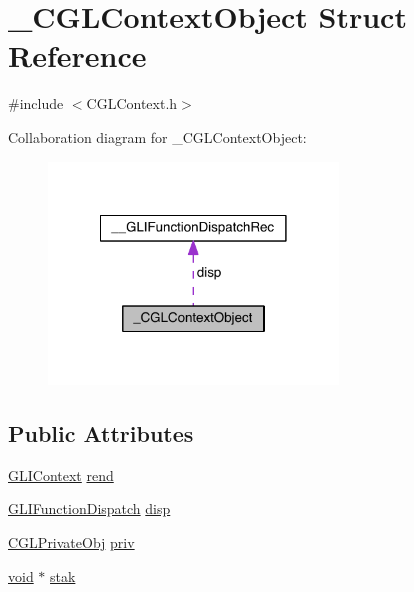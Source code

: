 \hypertarget{struct___c_g_l_context_object}{\section{\-\_\-\-C\-G\-L\-Context\-Object Struct Reference}
\label{struct___c_g_l_context_object}
}


{\ttfamily \#include $<$C\-G\-L\-Context.\-h$>$}



Collaboration diagram for \-\_\-\-C\-G\-L\-Context\-Object\-:
\nopagebreak
\begin{figure}[H]
\begin{center}
\leavevmode
\includegraphics[width=218pt]{struct___c_g_l_context_object__coll__graph}
\end{center}
\end{figure}
\subsection*{Public Attributes}
\begin{DoxyCompactItemize}
\item 
\hyperlink{gli_context_8h_a9243ff8480d2878cd8374328404539de}{G\-L\-I\-Context} \hyperlink{struct___c_g_l_context_object_ac6f613aaaa3bccc159301c77b21c2936}{rend}
\item 
\hyperlink{gli_dispatch_8h_a3a00775396c54c5f50c81ce040d401d8}{G\-L\-I\-Function\-Dispatch} \hyperlink{struct___c_g_l_context_object_aa291770f316f46b4324e2fa46f777a27}{disp}
\item 
\hyperlink{_c_g_l_context_8h_a877227a11fe9df1ad6f947ec22494aee}{C\-G\-L\-Private\-Obj} \hyperlink{struct___c_g_l_context_object_a352c695320144d77502931b57be65140}{priv}
\item 
\hyperlink{glutf90_8h_ac778d6f63f1aaf8ebda0ce6ac821b56e}{void} $\ast$ \hyperlink{struct___c_g_l_context_object_aa676a2022d2d5f49bdb5b4ef41a2cba8}{stak}
\end{DoxyCompactItemize}


